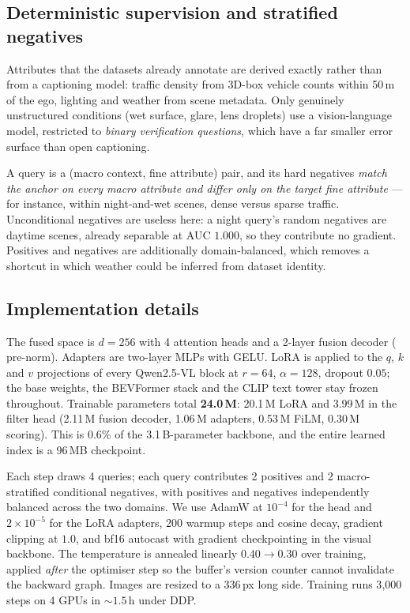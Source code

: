 \documentclass[10pt,twocolumn,letterpaper]{article}
\begin{document}
\subsection{Deterministic supervision and stratified negatives}
\label{sec:strat}
Attributes that the datasets already annotate are derived exactly rather
than from a captioning model: traffic density from 3D-box vehicle counts
within 50\,m of the ego, lighting and weather from scene metadata. Only
genuinely unstructured conditions (wet surface, glare, lens droplets) use
a vision-language model, restricted to \emph{binary verification
questions}, which have a far smaller error surface than open captioning.

A query is a (macro context, fine attribute) pair, and its hard negatives
\emph{match the anchor on every macro attribute and differ only on the
target fine attribute} --- for instance, within night-and-wet scenes,
dense versus sparse traffic. Unconditional negatives are useless here:
a night query's random negatives are daytime scenes, already separable at
AUC $1.000$, so they contribute no gradient. Positives and negatives are
additionally domain-balanced, which removes a shortcut in which weather
could be inferred from dataset identity.


\subsection{Implementation details}
\label{sec:impl}
The fused space is $d\!=\!256$ with 4 attention heads and a 2-layer fusion
decoder ($\mathrm{pre\text{-}norm}$). Adapters are two-layer MLPs with GELU.
LoRA is applied to the $q$, $k$ and $v$ projections of every Qwen2.5-VL
block at $r\!=\!64$, $\alpha\!=\!128$, dropout $0.05$; the base weights, the
BEVFormer stack and the CLIP text tower stay frozen throughout. Trainable
parameters total \textbf{24.0\,M}: 20.1\,M LoRA and 3.99\,M in the filter
head (2.11\,M fusion decoder, 1.06\,M adapters, 0.53\,M FiLM, 0.30\,M
scoring). This is $0.6\%$ of the 3.1\,B-parameter backbone, and the entire
learned index is a 96\,MB checkpoint.

Each step draws 4 queries; each query contributes 2 positives and 2
macro-stratified conditional negatives, with positives and negatives
independently balanced across the two domains. We use AdamW at $10^{-4}$
for the head and $2\times10^{-5}$ for the LoRA adapters, 200 warmup steps
and cosine decay, gradient clipping at $1.0$, and bf16 autocast with
gradient checkpointing in the visual backbone. The temperature is annealed
linearly $0.40\!\rightarrow\!0.30$ over training, applied \emph{after} the
optimiser step so the buffer's version counter cannot invalidate the
backward graph. Images are resized to a 336\,px long side. Training runs
3{,}000 steps on 4 GPUs in ${\sim}1.5$\,h under DDP.
\end{document}

